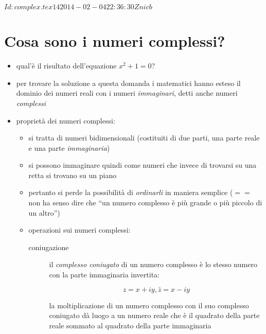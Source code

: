 %
%
\svnInfo $Id: complex.tex 14 2014-02-04 22:36:30Z nicb $

\section{Cosa sono i numeri complessi?\label{sec:cosa}}

\begin{itemize}

	\item qual'\`e il risultato dell'equazione $x^2 + 1 = 0$?

	\item per trovare la soluzione a questa domanda i matematici hanno esteso il
	dominio dei numeri reali con i numeri \emph{immaginari}, detti anche numeri
	\emph{complessi}

  \item propriet\`a dei numeri complessi:

		\begin{itemize}
	
	  	\item si tratta di numeri bidimensionali
	          (costituiti di due parti, una parte reale e una parte \emph{immaginaria})

			\item si possono immaginare quindi come numeri che invece di trovarsi su
						una retta si trovano su un piano

			\item pertanto si perde la possibilit\`a di \emph{ordinarli} in maniera
			      semplice ($==$ non ha senso dire che ``un numero complesso \`e
						pi\`u grande o pi\`u piccolo di un altro'')

			\item operazioni sui numeri complessi:

					\begin{description}

					  \item[coniugazione] il \emph{complesso coniugato} di un
						numero complesso \`e lo stesso numero con la parte immaginaria
						invertita:

							\begin{equation}
								z = x + i y, \bar{z} = x - i y
							\end{equation}

						la moltiplicazione di un numero complesso con il suo complesso
						coniugato d\`a luogo a un numero reale che \`e il quadrato della
						parte reale sommato al quadrato della parte immaginaria


\end{description}
\end{itemize}
\end{itemize}
